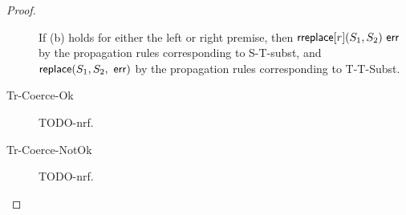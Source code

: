 \documentclass{acm_proc_article-sp}
\theoremstyle{definition}
\newcommand{\sisubst}[3]{{\sf rreplace}[#1](#2,#3)} \newcommand{\rreplace}[3]{{\sf rreplace}[#1](#2,#3)} %
\newcommand{\tsubst}[3]{{\sf replace}(#1,#2,#3)} \newcommand{\metareplace}[3]{{\sf replace}(#1,#2,#3)} %
\newcommand{\err}{\ {\sf err}}
\begin{document}
\begin{proof}
\begin{description}
If (b) holds for either the left or right premise, then $\sisubst{r}{S_1}{S_2} \err$ by the propagation rules corresponding to S-T-subst, 
and $\tsubst{S_1}{S_2} \err$ by the propagation rules corresponding to T-T-Subst.

\item[Tr-Coerce-Ok] TODO-nrf.

\item[Tr-Coerce-NotOk] TODO-nrf.

\end{description}
\end{proof}




\newcommand{\F}[1]{\textsf{#1}~}
\newcommand{\FF}[1]{\textsf{#1}}
\newcommand{\Q}{\FF{Arg}}
\newcommand{\xlA}[1]{\lfloor #1 \rfloor_{\lambda}}
\newcommand{\xA}[1]{$\lfloor #1 \rfloor_{\text{Ace}}$}
\newcommand{\rtotau}[1]{\lfloor #1 \rfloor}
\end{document}
